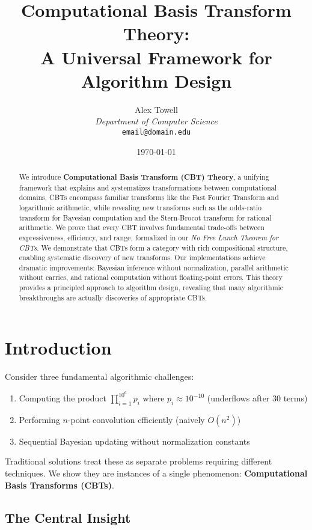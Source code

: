 \documentclass[12pt,a4paper]{article}
\title{Computational Basis Transform Theory:\\
A Universal Framework for Algorithm Design}
\author{
    Alex Towell\\
    \textit{Department of Computer Science}\\
    \texttt{email@domain.edu}
}
\date{\today}
\theoremstyle{definition}
\begin{document}
\maketitle

\begin{abstract}
We introduce \textbf{Computational Basis Transform (CBT) Theory}, a unifying framework that explains and systematizes transformations between computational domains. CBTs encompass familiar transforms like the Fast Fourier Transform and logarithmic arithmetic, while revealing new transforms such as the odds-ratio transform for Bayesian computation and the Stern-Brocot transform for rational arithmetic. We prove that every CBT involves fundamental trade-offs between expressiveness, efficiency, and range, formalized in our \textit{No Free Lunch Theorem for CBTs}. We demonstrate that CBTs form a category with rich compositional structure, enabling systematic discovery of new transforms. Our implementations achieve dramatic improvements: Bayesian inference without normalization, parallel arithmetic without carries, and rational computation without floating-point errors. This theory provides a principled approach to algorithm design, revealing that many algorithmic breakthroughs are actually discoveries of appropriate CBTs.
\end{abstract}

\section{Introduction}

Consider three fundamental algorithmic challenges:

\begin{enumerate}
\item Computing the product $\prod_{i=1}^{10^6} p_i$ where $p_i \approx 10^{-10}$ (underflows after 30 terms)
\item Performing $n$-point convolution efficiently (naively $O(n^2)$)
\item Sequential Bayesian updating without normalization constants
\end{enumerate}

Traditional solutions treat these as separate problems requiring different techniques. We show they are instances of a single phenomenon: \textbf{Computational Basis Transforms (CBTs)}.

\subsection{The Central Insight}
\end{document}
